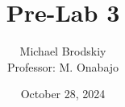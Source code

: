 


\title{Pre-Lab 3}
\date{October 28, 2024}
\author{Michael Brodskiy\\ \small Professor: M. Onabajo}



\maketitle

